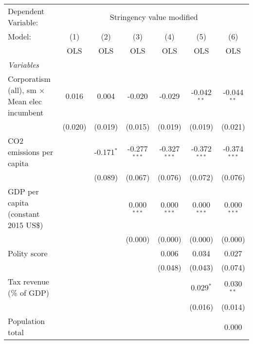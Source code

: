
\begingroup
\centering
\begin{tabular}{lcccccc}
   \toprule
   Dependent Variable: & \multicolumn{6}{c}{Stringency value modified}\\
   Model:                                              & (1)     & (2)          & (3)            & (4)            & (5)            & (6)\\  
                                                       &  OLS    & OLS          & OLS            & OLS            & OLS            & OLS\\  
   \midrule
   \emph{Variables}\\
   Corporatism (all), sm $\times$ Mean elec incumbent  & 0.016   & 0.004        & -0.020         & -0.029         & -0.042$^{**}$  & -0.044$^{**}$\\   
                                                       & (0.020) & (0.019)      & (0.015)        & (0.019)        & (0.019)        & (0.021)\\   
   CO2 emissions per capita                            &         & -0.171$^{*}$ & -0.277$^{***}$ & -0.327$^{***}$ & -0.372$^{***}$ & -0.374$^{***}$\\   
                                                       &         & (0.089)      & (0.067)        & (0.076)        & (0.072)        & (0.076)\\   
   GDP per capita (constant 2015 US\$)                 &         &              & 0.000$^{***}$  & 0.000$^{***}$  & 0.000$^{***}$  & 0.000$^{***}$\\   
                                                       &         &              & (0.000)        & (0.000)        & (0.000)        & (0.000)\\   
   Polity score                                        &         &              &                & 0.006          & 0.034          & 0.027\\   
                                                       &         &              &                & (0.048)        & (0.043)        & (0.074)\\   
   Tax revenue (\% of GDP)                             &         &              &                &                & 0.029$^{*}$    & 0.030$^{**}$\\   
                                                       &         &              &                &                & (0.016)        & (0.014)\\   
   Population total                                    &         &              &                &                &                & 0.000\\   

\end{tabular}
